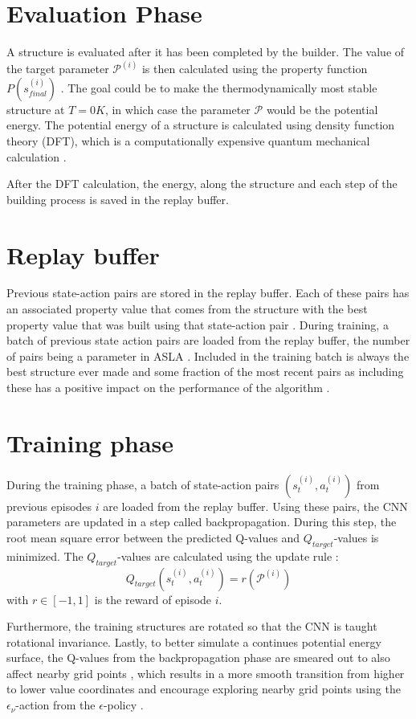 \section{Evaluation Phase}
A structure is evaluated after it has been completed by the builder. The value of the target parameter $\mathcal{P}^{(i)}$ is then calculated using the property function $P(s^{(i)}_{final})$ \cite{Hammer}. The goal could be to make the thermodynamically most stable structure at $T=0K$, in which case the parameter $\mathcal{P}$ would be the potential energy. The potential energy of a structure is calculated using density function theory (DFT), which is a computationally expensive quantum mechanical calculation \cite{henrik_DLA}.

After the DFT calculation, the energy, along the structure and each step of the building process is saved in the replay buffer. 

\section{Replay buffer}

Previous state-action pairs are stored in the replay buffer. Each of these pairs has an associated property value that comes from the structure with the best property value that was built using that state-action pair \cite{henrik_DLA}. During training, a batch of previous state action pairs are loaded from the replay buffer, the number of pairs being a parameter in ASLA \cite{henrik_DLA}. Included in the training batch is always the best structure ever made and some fraction of the most recent pairs as including these has a positive impact on the performance of the algorithm \cite{henrik_DLA}.


\section{Training phase}

During the training phase, a batch of state-action pairs $(s^{(i)}_t, a^{(i)}_t)$ from previous episodes $i$ are loaded from the replay buffer. Using these pairs, the CNN parameters are updated in a step called backpropagation. During this step, the root mean square error between the predicted Q-values and $Q_{target}$-values is minimized. The $Q_{target}$-values are calculated using the update rule \cite{Hammer}:
\begin{equation}
Q_{target}(s_t^{(i)}, a_t^{(i)}) = r(\mathcal{P}^{(i)})
\label{eq:update_rule}
\end{equation}
with $r\in [-1, 1]$ is the reward of episode $i$.

Furthermore, the training structures are rotated so that the CNN is taught rotational invariance. Lastly, to better simulate a continues potential energy surface, the Q-values from the backpropagation phase are smeared out to also affect nearby grid points , which results in a more smooth transition from higher to lower value coordinates and encourage exploring nearby grid points using the $\epsilon_\nu$-action from the $\epsilon$-policy \cite{Hammer}.






